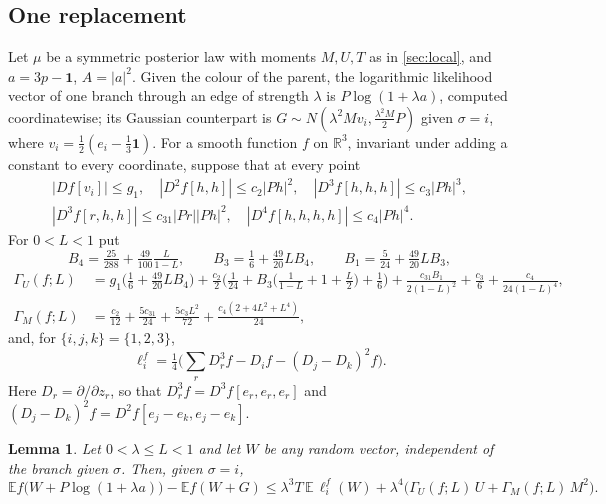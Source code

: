 \documentclass[11pt]{amsart}
\newtheorem{lemma}[theorem]{Lemma}
\theoremstyle{definition}
\theoremstyle{remark}
\newcommand{\E}{\mathbb{E}}
\newcommand{\R}{\mathbb{R}}
\newcommand{\one}{\mathbf{1}}
\begin{document}
\subsection{One replacement}
Let $\mu$ be a symmetric posterior law with moments $M,U,T$ as in \cref{sec:local}, and $a=3p-\one$, $A=|a|^2$. Given
the colour of the parent, the logarithmic likelihood vector of one branch through an edge of strength $\lambda$ is
$P\log(1+\lambda a)$, computed coordinatewise; its Gaussian counterpart is $G\sim N(\lambda^2Mv_i,
\tfrac{\lambda^2M}2P)$ given $\sigma=i$, where $v_i=\tfrac12(e_i-\tfrac13\one)$. For a smooth function $f$ on
$\R^3$, invariant under adding a constant to every coordinate, suppose that at every point
\begin{equation}\label{eq:derivs}
\begin{gathered}
|Df[v_i]|\le g_1,\quad |D^2f[h,h]|\le c_2|Ph|^2,\quad |D^3f[h,h,h]|\le c_3|Ph|^3,\\
|D^3f[r,h,h]|\le c_{31}|Pr||Ph|^2,\quad |D^4f[h,h,h,h]|\le c_4|Ph|^4 .
\end{gathered}
\end{equation}
For $0<L<1$ put
\[
B_4=\tfrac{25}{288}+\tfrac{49}{100}\tfrac L{1-L},\qquad B_3=\tfrac16+\tfrac{49}{20}LB_4,\qquad
B_1=\tfrac5{24}+\tfrac{49}{20}LB_3,
\]
\begin{align*}
\Gamma_U(f;L)&=g_1\Big(\tfrac16+\tfrac{49}{20}LB_4\Big)+\tfrac{c_2}2\Big(\tfrac1{24}+B_3\big(\tfrac1{1-L}+1+\tfrac L2\big)+\tfrac16\Big)
+\tfrac{c_{31}B_1}{2(1-L)^2}+\tfrac{c_3}6+\tfrac{c_4}{24(1-L)^4},\\
\Gamma_M(f;L)&=\tfrac{c_2}{12}+\tfrac{5c_{31}}{24}+\tfrac{5c_3L^2}{72}+\tfrac{c_4(2+4L^2+L^4)}{24},
\end{align*}
and, for $\{i,j,k\}=\{1,2,3\}$,
\begin{equation}\label{eq:ell}
\ell_i^f=\tfrac14\Big(\textstyle\sum_rD_r^3f-D_if-(D_j-D_k)^2f\Big).
\end{equation}
Here $D_r=\partial/\partial z_r$, so that $D_r^3f=D^3f[e_r,e_r,e_r]$ and $(D_j-D_k)^2f=D^2f[e_j-e_k,e_j-e_k]$.

\begin{lemma}\label{lem:replace}
Let $0<\lambda\le L<1$ and let $W$ be any random vector, independent of the branch given $\sigma$. Then, given
$\sigma=i$,
\[
\E f\big(W+P\log(1+\lambda a)\big)-\E f(W+G)
\le\lambda^3T\,\E\,\ell_i^f(W)+\lambda^4\big(\Gamma_U(f;L)\,U+\Gamma_M(f;L)\,M^2\big).
\]
\end{lemma}
\end{document}
